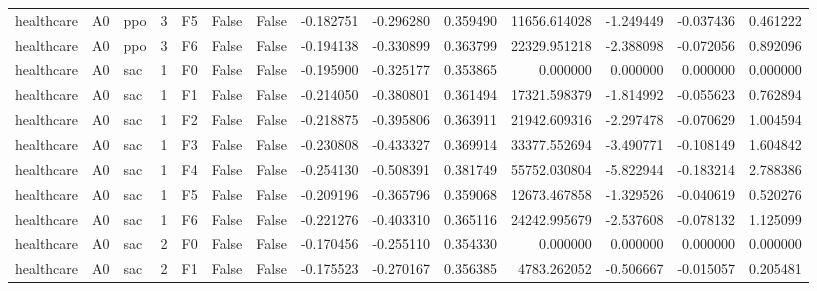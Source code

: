\begin{tabular}{lllrlllrrrrrrr}
healthcare &      A0 &       ppo &     3 &  F5 &           False &            False & -0.182751 & -0.296280 & 0.359490 &     11656.614028 &          -1.249449 &       -0.037436 &            0.461222 \\
healthcare &      A0 &       ppo &     3 &  F6 &           False &            False & -0.194138 & -0.330899 & 0.363799 &     22329.951218 &          -2.388098 &       -0.072056 &            0.892096 \\
healthcare &      A0 &       sac &     1 &  F0 &           False &            False & -0.195900 & -0.325177 & 0.353865 &         0.000000 &           0.000000 &        0.000000 &            0.000000 \\
healthcare &      A0 &       sac &     1 &  F1 &           False &            False & -0.214050 & -0.380801 & 0.361494 &     17321.598379 &          -1.814992 &       -0.055623 &            0.762894 \\
healthcare &      A0 &       sac &     1 &  F2 &           False &            False & -0.218875 & -0.395806 & 0.363911 &     21942.609316 &          -2.297478 &       -0.070629 &            1.004594 \\
healthcare &      A0 &       sac &     1 &  F3 &           False &            False & -0.230808 & -0.433327 & 0.369914 &     33377.552694 &          -3.490771 &       -0.108149 &            1.604842 \\
healthcare &      A0 &       sac &     1 &  F4 &           False &            False & -0.254130 & -0.508391 & 0.381749 &     55752.030804 &          -5.822944 &       -0.183214 &            2.788386 \\
healthcare &      A0 &       sac &     1 &  F5 &           False &            False & -0.209196 & -0.365796 & 0.359068 &     12673.467858 &          -1.329526 &       -0.040619 &            0.520276 \\
healthcare &      A0 &       sac &     1 &  F6 &           False &            False & -0.221276 & -0.403310 & 0.365116 &     24242.995679 &          -2.537608 &       -0.078132 &            1.125099 \\
healthcare &      A0 &       sac &     2 &  F0 &           False &            False & -0.170456 & -0.255110 & 0.354330 &         0.000000 &           0.000000 &        0.000000 &            0.000000 \\
healthcare &      A0 &       sac &     2 &  F1 &           False &            False & -0.175523 & -0.270167 & 0.356385 &      4783.262052 &          -0.506667 &       -0.015057 &            0.205481 \\

\end{tabular}
